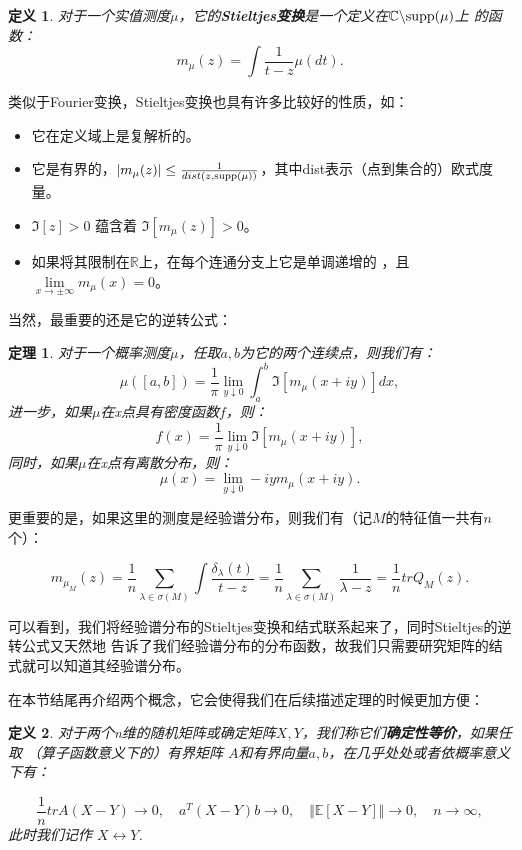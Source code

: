 \documentclass[UTF8,12pt]{ctexart}
\newtheorem{definition}{定义}
\newtheorem{theorem}{定理}
\begin{document}
\begin{definition}
    对于一个实值测度$\mu$，它的\textbf{Stieltjes变换}是一个定义在$\mathbb C \backslash \textup{supp}(\mu) $上
    的函数：
    \[
    m_{\mu}(z) = \int \frac{1}{t-z}\mu(dt).
    \]
\end{definition}

类似于Fourier变换，Stieltjes变换也具有许多比较好的性质，如：
\begin{itemize}
    \item 它在定义域上是复解析的。
    \item 它是有界的，$|m_{\mu}(z)| \leq \frac{1}{dist(z,\textup{supp}(\mu))}$，其中dist表示（点到集合的）欧式度量。
    \item $\Im[z]>0$ 蕴含着 $\Im[m_{\mu}(z)]>0$。
    \item 如果将其限制在$\mathbb R$上，在每个连通分支上它是单调递增的
    ，且$\lim\limits_{x \rightarrow \pm \infty} m_{\mu}(x)= 0$。
\end{itemize}

当然，最重要的还是它的逆转公式：

\begin{theorem}
    对于一个概率测度$\mu$，任取$a,b$为它的两个连续点，则我们有：
    \[
        \mu([a,b]) = \frac{1}{\pi} \lim\limits_{y \downarrow 0} \int_a^b \Im[m_{\mu}(x+iy)]dx,   
    \]
    进一步，如果$\mu$在x点具有密度函数$f$，则：
    \[
        f(x) = \frac{1}{\pi}\lim\limits_{y \downarrow 0}\Im[m_{\mu}(x+iy)],
    \]
    同时，如果$\mu$在x点有离散分布，则：
    \[
        \mu({x}) = \lim\limits_{y\downarrow 0}-iym_{\mu}(x+iy).  
    \]
\end{theorem}

更重要的是，如果这里的测度是经验谱分布，则我们有（记$M$的特征值一共有$n$个）：

\[
    m_{\mu_M}(z) = \frac{1}{n}\sum\limits_{\lambda \in \sigma(M)}\int\frac{\delta_{\lambda}(t)}{t-z}
    = \frac{1}{n}\sum\limits_{\lambda \in \sigma(M)}\frac{1}{\lambda-z} = \frac{1}{n}trQ_M(z).
\]

可以看到，我们将经验谱分布的Stieltjes变换和结式联系起来了，同时Stieltjes的逆转公式又天然地
告诉了我们经验谱分布的分布函数，故我们只需要研究矩阵的结式就可以知道其经验谱分布。

在本节结尾再介绍两个概念，它会使得我们在后续描述定理的时候更加方便：

\begin{definition}
    对于两个n维的随机矩阵或确定矩阵$X,Y$，我们称它们\textbf{确定性等价}，如果任取
    （算子函数意义下的）有界矩阵
    $A$和有界向量$a,b$，在几乎处处或者依概率意义下有：

    \[
        \frac{1}{n}trA(X-Y)\rightarrow 0, \quad a^T(X-Y)b \rightarrow 0, \quad
        \Vert\mathbb E[X-Y]\Vert \rightarrow 0, \quad n \rightarrow \infty,
    \]
    此时我们记作 $X\leftrightarrow Y$.
\end{definition}
\end{document}
